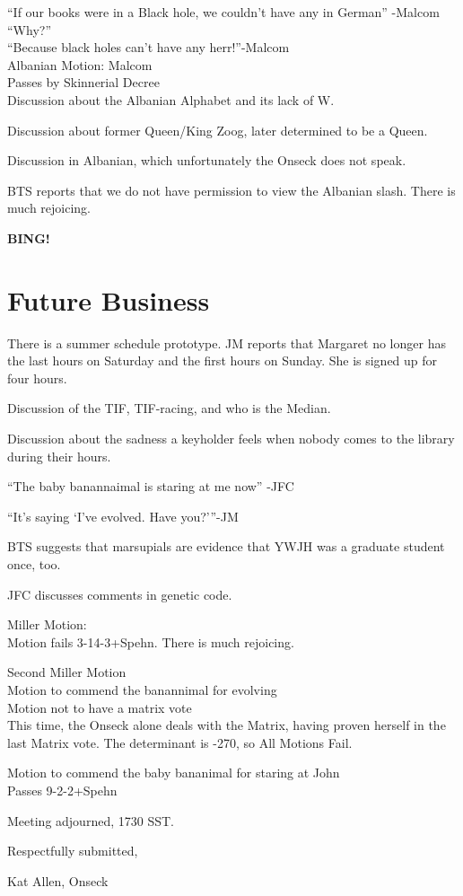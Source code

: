 \documentclass[10pt]{article}
\newcommand{\bing}{{\bf BING!} }
\begin{document}
``If our books were in a Black hole, we couldn't have any in German''
-Malcom \\
``Why?'' \\
``Because black holes can't have any herr!''-Malcom\\

Albanian Motion: Malcom\\
Passes by Skinnerial Decree\\

Discussion about the Albanian Alphabet and its lack of W.

Discussion about former Queen/King Zoog, later determined to be a
Queen.

Discussion in Albanian, which unfortunately the Onseck does not speak.

BTS reports that we do not have permission to view the Albanian
slash. There is much rejoicing.

\bing

\section*{Future Business}
There is a summer schedule prototype.
JM reports that Margaret no longer has the last hours on Saturday and
the first hours on Sunday.  She is signed up for four hours. 

Discussion of the TIF, TIF-racing, and who is the Median.

Discussion about the sadness a keyholder feels when nobody comes to
the library during their hours.

``The baby banannaimal is staring at me now'' -JFC

``It's saying `I've evolved. Have you?'''-JM

BTS suggests that marsupials are evidence that YWJH was a graduate
student once, too.

JFC discusses comments in genetic code.

Miller Motion:\\
Motion fails 3-14-3+Spehn. There is much rejoicing.


Second Miller Motion\\
Motion to commend the banannimal for evolving\\
Motion not to have a matrix vote\\

This time, the Onseck alone deals with the Matrix, having proven
herself in the last Matrix vote. 
The determinant is -270, so All Motions Fail.

Motion to commend the baby bananimal for staring at John\\
Passes 9-2-2+Spehn

\vspace{12pt}

\noindent
Meeting adjourned, 1730 SST.

\vspace{18pt}

\centerline{Respectfully submitted,}
\centerline{Kat Allen,  Onseck}
\end{document}
